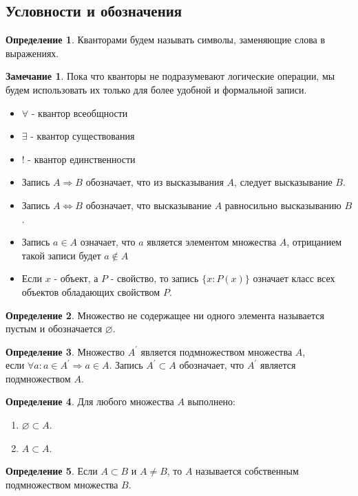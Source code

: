 \documentclass[a4paper, 12pt]{article}
\newcommand{\lra}{\Leftrightarrow}
\renewcommand{\emptyset}{\varnothing}
\theoremstyle{definition}
\newtheorem*{definition}{Определение}
\newtheorem*{comm}{Замечание}
\begin{document}
    \subsection{Условности и обозначения}
        \begin{definition}
            Кванторами будем называть символы, заменяющие слова в выражениях.
        \end{definition}
        \begin{comm}
            Пока что кванторы не подразумевают логические операции, мы будем использовать их только для более удобной и формальной записи.
        \end{comm}
        \begin{itemize}
            \item $\forall$ - квантор всеобщности
            \item $\exists$ - квантор существования
            \item $!$ - квантор единственности
            \item Запись $A \Rightarrow B$ обозначает, что из высказывания $A$, следует высказывание $B$. 
            \item Запись $A \lra B$ обозначает, что высказывание $A$ равносильно высказыванию $B$.
            \item Запись $a \in A$ означает, что $a$ является элементом множества $A$, отрицанием такой записи будет $a \notin A$
            \item Если $x$ - объект, а $P$ - свойство, то запись $\{x : P(x)\}$ означает класс всех объектов обладающих свойством $P$.
        \end{itemize}
        \begin{definition}
            Множество не содержащее ни одного элемента называется пустым и обозначается $\emptyset$.
        \end{definition}
        \begin{definition}
            Множество $A^{\prime}$ является подмножеством множества $A$, \\ если $\forall a: a\in A^{\prime}\Rightarrow a\in A$. Запись $A^{\prime} \subset A$ обозначает, что $A^{\prime}$ является подмножеством $A$.
        \end{definition}        
        \begin{definition}
            Для любого множества $A$ выполнено:
            \begin{enumerate}
                \item $\emptyset \subset A$.
                \item $A \subset A$.
            \end{enumerate}
        \end{definition}
        \begin{definition}
            Если $A\subset B$ и $A\ne B$, то $A$ называется собственным подмножеством множества $B$.
        \end{definition}
\end{document}
